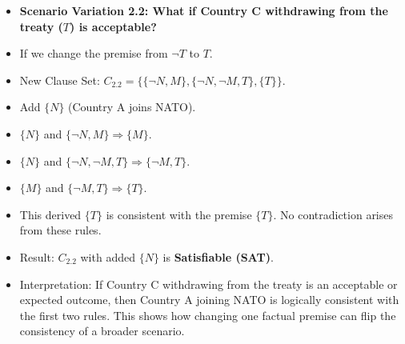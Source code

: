 \documentclass[11pt, a4paper]{article}
\begin{document}
\begin{itemize}
    \item \textbf{Scenario Variation 2.2: What if Country C withdrawing from the treaty ($T$) is acceptable?}
        \item If we change the premise from $\neg T$ to $T$.
        \item New Clause Set: $C_{2.2} = \{\{\neg N, M\}, \{\neg N, \neg M, T\}, \{T\}\}$.
        \item Add $\{N\}$ (Country A joins NATO).
        \item $\{N\}$ and $\{\neg N, M\} \Rightarrow \{M\}$.
        \item $\{N\}$ and $\{\neg N, \neg M, T\} \Rightarrow \{\neg M, T\}$.
        \item $\{M\}$ and $\{\neg M, T\} \Rightarrow \{T\}$.
        \item This derived $\{T\}$ is consistent with the premise $\{T\}$. No contradiction arises from these rules.
        \item Result: $C_{2.2}$ with added $\{N\}$ is \textbf{Satisfiable (SAT)}.
        \item Interpretation: If Country C withdrawing from the treaty is an acceptable or expected outcome, then Country A joining NATO is logically consistent with the first two rules. This shows how changing one factual premise can flip the consistency of a broader scenario.
\end{itemize}
\end{document}
